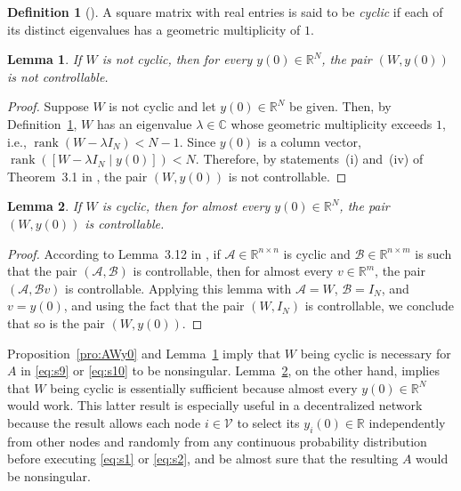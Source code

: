 \documentclass[11pt]{article}
\theoremstyle{plain}
\newtheorem{lemma}{Lemma}
\theoremstyle{definition}
\newtheorem{definition}{Definition}
\theoremstyle{remark}
\begin{document}
\begin{definition}[\!\!\cite{ZhouK96}]\label{def:cyc}
A square matrix with real entries is said to be {\em cyclic} if each of its distinct eigenvalues has a geometric multiplicity of $1$.
\end{definition}

\begin{lemma}\label{lem:Wnotcyc}
If $W$ is not cyclic, then for every $y(0)\in\mathbb{R}^N$, the pair $(W,y(0))$ is not controllable.
\end{lemma}

\begin{proof}
Suppose $W$ is not cyclic and let $y(0)\in\mathbb{R}^N$ be given. Then, by Definition~\ref{def:cyc}, $W$ has an eigenvalue $\lambda\in\mathbb{C}$ whose geometric multiplicity exceeds $1$, i.e., $\operatorname{rank}(W-\lambda I_N)<N-1$. Since $y(0)$ is a column vector, $\operatorname{rank}([W-\lambda I_N\;|\;y(0)])<N$. Therefore, by statements~(i) and~(iv) of Theorem~3.1 in \cite{ZhouK96}, the pair $(W,y(0))$ is not controllable.
\end{proof}

\begin{lemma}\label{lem:Wcyc}
If $W$ is cyclic, then for almost every $y(0)\in\mathbb{R}^N$, the pair $(W,y(0))$ is controllable.
\end{lemma}

\begin{proof}
According to Lemma~3.12 in \cite{ZhouK96}, if $\mathcal{A}\in\mathbb{R}^{n\times n}$ is cyclic and $\mathcal{B}\in\mathbb{R}^{n\times m}$ is such that the pair $(\mathcal{A},\mathcal{B})$ is controllable, then for almost every $v\in\mathbb{R}^m$, the pair $(\mathcal{A},\mathcal{B}v)$ is controllable. Applying this lemma with $\mathcal{A}=W$, $\mathcal{B}=I_N$, and $v=y(0)$, and using the fact that the pair $(W,I_N)$ is controllable, we conclude that so is the pair $(W,y(0))$.
\end{proof}

Proposition~\ref{pro:AWy0} and Lemma~\ref{lem:Wnotcyc} imply that $W$ being cyclic is necessary for $A$ in \eqref{eq:s9} or \eqref{eq:s10} to be nonsingular. Lemma~\ref{lem:Wcyc}, on the other hand, implies that $W$ being cyclic is essentially sufficient because almost every $y(0)\in\mathbb{R}^N$ would work. This latter result is especially useful in a decentralized network because the result allows each node $i\in\mathcal{V}$ to select its $y_i(0)\in\mathbb{R}$ independently from other nodes and randomly from any continuous probability distribution before executing \eqref{eq:s1} or \eqref{eq:s2}, and be almost sure that the resulting $A$ would be nonsingular.
\end{document}
